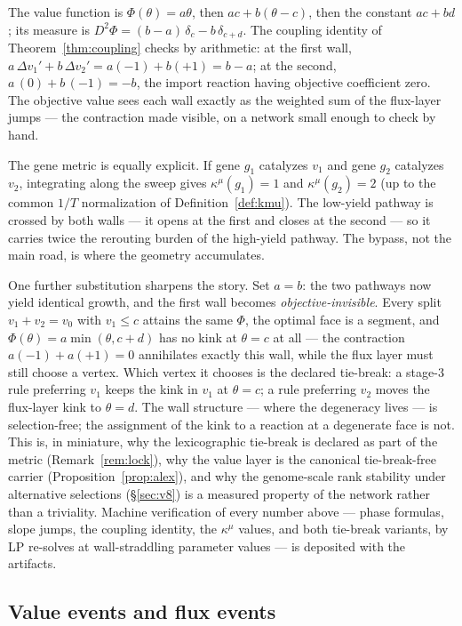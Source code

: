 \documentclass[11pt,a4paper]{article}
\theoremstyle{plain}
\theoremstyle{definition}
\theoremstyle{remark}
\newcommand{\kmu}{\kappa^{\mu}}
\begin{document}
The value function is $\Phi(\theta) = a\theta$, then $ac + b(\theta
- c)$, then the constant $ac + bd$; its measure is $D^2\Phi = (b -
a)\,\delta_c - b\,\delta_{c+d}$. The coupling identity of
Theorem~\ref{thm:coupling} checks by arithmetic: at the first
wall, $a\,\Delta v_1' + b\,\Delta v_2' = a(-1) + b(+1) = b - a$;
at the second, $a\,(0) + b\,(-1) = -b$, the import reaction having
objective coefficient zero. The objective value sees each wall
exactly as the weighted sum of the flux-layer jumps --- the
contraction made visible, on a network small enough to check by
hand.

The gene metric is equally explicit. If gene $g_1$ catalyzes $v_1$
and gene $g_2$ catalyzes $v_2$, integrating along the sweep gives
$\kmu(g_1) = 1$ and $\kmu(g_2) = 2$ (up to the common $1/T$
normalization of Definition~\ref{def:kmu}). The low-yield pathway
is crossed by both walls --- it opens at the first and closes at
the second --- so it carries twice the rerouting burden of the
high-yield pathway. The bypass, not the main road, is where the
geometry accumulates.

One further substitution sharpens the story. Set $a = b$: the two
pathways now yield identical growth, and the first wall becomes
\emph{objective-invisible}. Every split $v_1 + v_2 = v_0$ with $v_1
\le c$ attains the same $\Phi$, the optimal face is a segment, and
$\Phi(\theta) = a\min(\theta, c + d)$ has no kink at $\theta = c$
at all --- the contraction $a(-1) + a(+1) = 0$ annihilates exactly
this wall, while the flux layer must still choose a vertex. Which
vertex it chooses is the declared tie-break: a stage-3 rule
preferring $v_1$ keeps the kink in $v_1$ at $\theta = c$; a rule
preferring $v_2$ moves the flux-layer kink to $\theta = d$. The
wall structure --- where the degeneracy lives --- is
selection-free; the assignment of the kink to a reaction at a
degenerate face is not. This is, in miniature, why the
lexicographic tie-break is declared as part of the metric
(Remark~\ref{rem:lock}), why the value layer is the canonical
tie-break-free carrier (Proposition~\ref{prop:alex}), and why the
genome-scale rank stability under alternative selections
(\S\ref{sec:v8}) is a measured property of the network rather than
a triviality. Machine verification of every number above --- phase
formulas, slope jumps, the coupling identity, the $\kmu$ values,
and both tie-break variants, by LP re-solves at wall-straddling
parameter values --- is deposited with the artifacts.
\subsection{Value events and flux events}\label{sec:valueflux}
\end{document}
